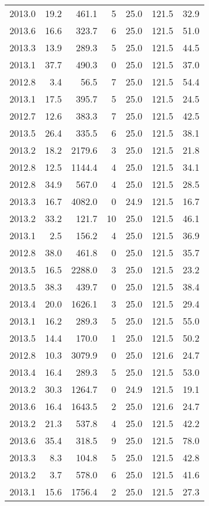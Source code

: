 \begin{tabular}{rrrrrrr}
2013.0 & 19.2 & 461.1 & 5 & 25.0 & 121.5 & 32.9 \\
2013.6 & 16.6 & 323.7 & 6 & 25.0 & 121.5 & 51.0 \\
2013.3 & 13.9 & 289.3 & 5 & 25.0 & 121.5 & 44.5 \\
2013.1 & 37.7 & 490.3 & 0 & 25.0 & 121.5 & 37.0 \\
2012.8 & 3.4 & 56.5 & 7 & 25.0 & 121.5 & 54.4 \\
2013.1 & 17.5 & 395.7 & 5 & 25.0 & 121.5 & 24.5 \\
2012.7 & 12.6 & 383.3 & 7 & 25.0 & 121.5 & 42.5 \\
2013.5 & 26.4 & 335.5 & 6 & 25.0 & 121.5 & 38.1 \\
2013.2 & 18.2 & 2179.6 & 3 & 25.0 & 121.5 & 21.8 \\
2012.8 & 12.5 & 1144.4 & 4 & 25.0 & 121.5 & 34.1 \\
2012.8 & 34.9 & 567.0 & 4 & 25.0 & 121.5 & 28.5 \\
2013.3 & 16.7 & 4082.0 & 0 & 24.9 & 121.5 & 16.7 \\
2013.2 & 33.2 & 121.7 & 10 & 25.0 & 121.5 & 46.1 \\
2013.1 & 2.5 & 156.2 & 4 & 25.0 & 121.5 & 36.9 \\
2012.8 & 38.0 & 461.8 & 0 & 25.0 & 121.5 & 35.7 \\
2013.5 & 16.5 & 2288.0 & 3 & 25.0 & 121.5 & 23.2 \\
2013.5 & 38.3 & 439.7 & 0 & 25.0 & 121.5 & 38.4 \\
2013.4 & 20.0 & 1626.1 & 3 & 25.0 & 121.5 & 29.4 \\
2013.1 & 16.2 & 289.3 & 5 & 25.0 & 121.5 & 55.0 \\
2013.5 & 14.4 & 170.0 & 1 & 25.0 & 121.5 & 50.2 \\
2012.8 & 10.3 & 3079.9 & 0 & 25.0 & 121.6 & 24.7 \\
2013.4 & 16.4 & 289.3 & 5 & 25.0 & 121.5 & 53.0 \\
2013.2 & 30.3 & 1264.7 & 0 & 24.9 & 121.5 & 19.1 \\
2013.6 & 16.4 & 1643.5 & 2 & 25.0 & 121.6 & 24.7 \\
2013.2 & 21.3 & 537.8 & 4 & 25.0 & 121.5 & 42.2 \\
2013.6 & 35.4 & 318.5 & 9 & 25.0 & 121.5 & 78.0 \\
2013.3 & 8.3 & 104.8 & 5 & 25.0 & 121.5 & 42.8 \\
2013.2 & 3.7 & 578.0 & 6 & 25.0 & 121.5 & 41.6 \\
2013.1 & 15.6 & 1756.4 & 2 & 25.0 & 121.5 & 27.3 \\

\end{tabular}
